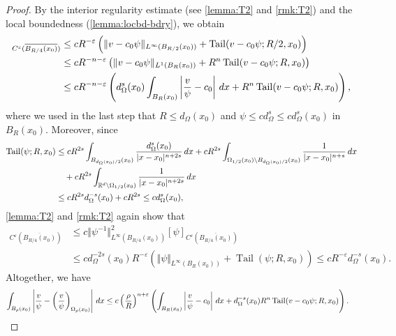 \documentclass[11pt,reqno]{amsart}
\theoremstyle{plain}
\theoremstyle{definition}
\numberwithin{equation}{section}
\newcommand{\R}{\mathbb{R}}
\newcommand{\1}{\mathbbm{1}}
\DeclareMathOperator{\tail}{Tail}
\renewcommand{\d}{\textnormal{\,d}}
\begin{document}
\begin{proof}
By the interior regularity estimate (see \autoref{lemma:T2} and \autoref{rmk:T2}) and the local boundedness (\autoref{lemma:locbd-bdry}), we obtain
\begin{align*}
    [v - c_0 \psi]_{C^{\varepsilon}(\overline{B_{R/4}(x_0)})} 
    &\leq cR^{-\varepsilon} \left( \Vert v-c_0\psi \Vert_{L^{\infty}(B_{R/2}(x_0))} + \tail(v-c_0\psi;R/2,x_0) \right) \\
    &\leq cR^{-n-\varepsilon} \left( \Vert v-c_0\psi \Vert_{L^1(B_{R}(x_0))} + R^n \tail(v-c_0\psi;R,x_0) \right) \\
    &\leq cR^{-n-\varepsilon} \left( d_\Omega^s(x_0) \int_{B_R(x_0)} \left| \frac{v}{\psi}-c_0 \right| \d x + R^n \tail(v-c_0\psi;R,x_0) \right),
\end{align*}
where we used in the last step that $R \le d_{\Omega}(x_0)$ and $\psi \leq c d_{\Omega}^s \le c d_{\Omega}^s(x_0)$ in $B_R(x_0)$. Moreover, since
\begin{align}
\label{eq:tail-phi-est}
\begin{split}
\tail(\psi;R,x_0)
&\le c R^{2s} \int_{B_{d_\Omega(x_0)/2}(x_0)} \frac{d_\Omega^s(x_0)}{|x-x_0|^{n+2s}} \d x + c R^{2s} \int_{\Omega_{1/2}(x_0) \setminus B_{d_\Omega(x_0)/2}(x_0)} \frac{1}{|x-x_0|^{n+s}} \d x \\
& \quad + c R^{2s} \int_{\R^d \setminus \Omega_{1/2}(x_0)} \frac{1}{|x-x_0|^{n+2s}} \d x \\
& \le c R^{2s} d_\Omega^{-s}(x_0) + c R^{2s} \le c d_\Omega^s(x_0),
\end{split}
\end{align}
\autoref{lemma:T2} and \autoref{rmk:T2} again show that
\begin{align*}
[\psi^{-1}]_{C^{\varepsilon}(\overline{B_{R/4}(x_0)})} &\le c \Vert \psi^{-1} \Vert_{L^{\infty}(B_{R/4}(x_0))}^2 [\psi]_{C^{\varepsilon}(\overline{B_{R/4}(x_0)})} \\
&\le c d_\Omega^{-2s}(x_0) R^{-\varepsilon} \left(\Vert \psi \Vert_{L^{\infty}(B_R(x_0))} + \tail(\psi;R,x_0) \right) \le c R^{-\varepsilon} d_\Omega^{-s}(x_0).
\end{align*}
Altogether, we have
\begin{align}\label{eq:campanato-inhom-BR}
\int_{B_{\rho}(x_0)} \left|\frac{v}{\psi} - \left( \frac{v}{\psi} \right)_{\Omega_{\rho}(x_0)} \right| \d x
&\leq c \left( \frac{\rho}{R} \right)^{n+\varepsilon} \left( \int_{B_R(x_0)} \left| \frac{v}{\psi}-c_0 \right| \d x + d_\Omega^{-s}(x_0)R^n \tail(v-c_0\psi;R,x_0) \right).
\end{align}




\end{proof}
\end{document}
